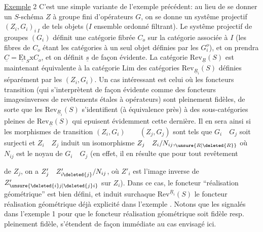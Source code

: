 \uline{Exemple} 2 C'est une simple variante de l'exemple précédent: au lieu de se donner un $S$-schéma $Z$ à groupe fini d'opérateurs $G$, on se donne un systême projectif $(Z_i,G_i)_{i\;I}$ de tels objets ($I$ ensemble ordonné filtrant).  Le systême projectif de groupes $(G_i)$ définit une catégorie fibrée $C_o$ sur la catégorie associée à $I$ (les fibres de $C_o$ étant les catégories à un seul objet définies par les $G_i^o$), et on prendra $\underline{C}=\underline{\mathrm{Et}}_S\mathrm{x}C_o$, et on définit $\underline{s}$ de façon évidente. La catégorie $\mathrm{Rev}_{\underline{R}}(S)$ est maintenant équivalente à la catégorie $\mathrm{Lim}$ des catégories $\mathrm{Rev}_{\underline{R}_i}(S)$ définies séparément par les $(Z_i,G_i)$. Un cas intéressant est celui où les foncteurs transition (qui s'interprètent de façon évidente comme des foncteurs imagesinverses de revêtements étales à opérateurs) sont pleinement fidèles, de sorte que les $\mathrm{Rev}_{\underline{R}_i}(S)$ s'identifient (à équivalence près) à des sous-catégories pleines de $\mathrm{Rev}_{\underline{R}}(S)$ qui epuisent évidemment cette dernière. Il en sera ainsi si les morphismes de transition $(Z_i,G_i)\qquad(Z_j,G_j)$ sont tels que $G_i\quad G_j$ soit surjecti et $Z_i\quad Z_j$ induit un isomorphisme $Z_j\quad Z_i/N_{ij}\mathord{,}_{\unsure{R|\deleted{R}}}$ où $N_{ij}$ est le noyau de $G_i\quad G_j$ (en effet, il en résulte que pour tout revêtement 

de $Z_j$, on a $Z'_j\quad Z'_{i\deleted{j}}/N_{ij}$, où $Z'_i$ est l'image inverse de $Z'_{\unsure{\deleted{i}j|\deleted{j}i}}$ sur $Z_i$). Dans ce cas, le foncteur ``réalisation géométrique'' est bien défini, et induit surchaque $\mathrm{Rev}^{\underline{R}_i}(S)$ le foncteur réalisation géométrique déjà explicité dans l'exemple .  Notons que les  signalés dans l'exemple 1 pour que le foncteur réalisation géométrique soit fidèle resp. pleinement fidèle, s'étendent de façon immédiate au cas envisagé ici.

